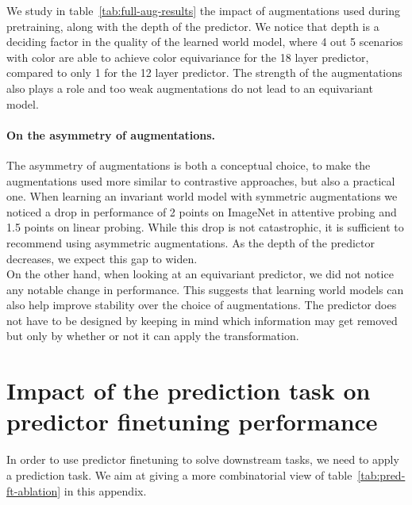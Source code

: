 \documentclass[twocolumn]{fairmeta}
\theoremstyle{plain}
\theoremstyle{definition}
\theoremstyle{remark}
\begin{document}
We study in table~\ref{tab:full-aug-results} the impact of augmentations used during pretraining, along with the depth of the predictor. We notice that depth is a deciding factor in the quality of the learned world model, where 4 out 5 scenarios with color are able to achieve color equivariance for the 18 layer predictor, compared to only 1 for the 12 layer predictor. The strength of the augmentations also plays a role and too weak augmentations do not lead to an equivariant model.


\paragraph{On the asymmetry of augmentations.}
The asymmetry of augmentations is both a conceptual choice, to make the augmentations used more similar to contrastive approaches, but also a practical one. When learning an invariant world model with symmetric augmentations we noticed a drop in performance of 2 points on ImageNet in attentive probing and 1.5 points on linear probing. While this drop is not catastrophic, it is sufficient to recommend using asymmetric augmentations. As the depth of the predictor decreases, we expect this gap to widen.\\
On the other hand, when looking at an equivariant predictor, we did not notice any notable change in performance. This suggests that learning world models can also help improve stability over the choice of augmentations. The predictor does not have to be designed by keeping in mind which information may get removed but only by whether or not it can apply the transformation.


\section{Impact of the prediction task on predictor finetuning performance\label{app:pred-task}}

In order to use predictor finetuning to solve downstream tasks, we need to apply a prediction task. We aim at giving a more combinatorial view of table~\ref{tab:pred-ft-ablation} in this appendix.
\end{document}
